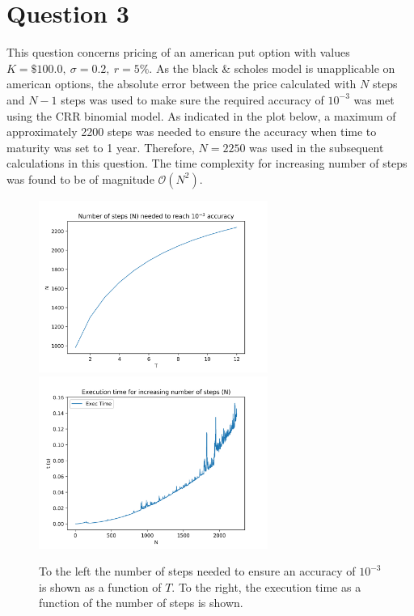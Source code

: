 \documentclass{article}
\begin{document}
\section*{Question 3}

This question concerns pricing of an american put option with values $K = \$100.0, \ \sigma = 0.2, \ r = 5\%$. As the black \& scholes model is unapplicable on american options, the absolute error between the price calculated with $N$ steps and $N-1$ steps was used to make sure the required accuracy of $10^{-3}$ was met using the CRR binomial model. As indicated in the plot below, a maximum of approximately 2200 steps was needed to ensure the accuracy when time to maturity was set to 1 year. Therefore, $N=2250$ was used in the subsequent calculations in this question. The time complexity for increasing number of steps was found to be of magnitude $\mathcal{O}(N^2)$.

\begin{figure}[H]
	\centering
	\includegraphics[width=75mm]{images/q3_n.png}
	\includegraphics[width=75mm]{images/q3_time.png}
	\caption{To the left the number of steps needed to ensure an accuracy of $10^{-3}$ is shown as a function of $T$. To the right, the execution time as a function of the number of steps is shown.}
\end{figure}
\end{document}
